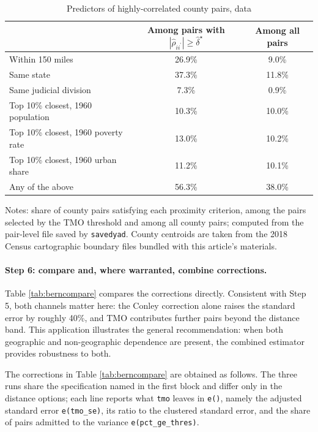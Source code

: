 \documentclass[varwidth,bib]{statapress}
\begin{document}
\begin{table}[H]
\centering
\caption{Predictors of highly-correlated county pairs, \citet{Berninietal2023} data}
\label{tab:bernpredictors}
\begin{threeparttable}
\begin{tabular}{lcc}
\toprule
 & Among pairs with $|\hat\rho_{ii^\prime}|\geq\hat\delta^\star$ & Among all pairs \\
\midrule
Within 150 miles                & 26.9\% & 9.0\% \\
Same state                      & 37.3\% & 11.8\% \\
Same judicial division          & 7.3\%  & 0.9\% \\
Top 10\% closest, 1960 population & 10.3\% & 10.0\% \\
Top 10\% closest, 1960 poverty rate & 13.0\% & 10.2\% \\
Top 10\% closest, 1960 urban share  & 11.2\% & 10.1\% \\
Any of the above                & 56.3\% & 38.0\% \\
\bottomrule
\end{tabular}
\begin{tablenotes}[flushleft]
\setlength{}\scriptsize
\item Notes: share of county pairs satisfying each proximity criterion, among the pairs selected by the TMO threshold and among all county pairs; computed from the pair-level file saved by {\tt savedyad}.  County centroids are taken from the 2018 Census cartographic boundary files bundled with this article's materials.
\end{tablenotes}
\end{threeparttable}
\end{table}

\paragraph{Step 6: compare and, where warranted, combine corrections.}
Table \ref{tab:berncompare} compares the corrections directly.  Consistent with Step 5, both channels matter here: the Conley correction alone raises the standard error by roughly 40\%, and TMO contributes further pairs beyond the distance band.  This application illustrates the general recommendation: when both geographic and non-geographic dependence are present, the combined estimator provides robustness to both.

The corrections in Table \ref{tab:berncompare} are obtained as follows.  The three runs share the specification named in the first block and differ only in the distance options; each line reports what {\tt tmo} leaves in {\tt e()}, namely the adjusted standard error {\tt e(tmo\_se)}, its ratio to the clustered standard error, and the share of pairs admitted to the variance {\tt e(pct\_ge\_thres)}.
\end{document}

